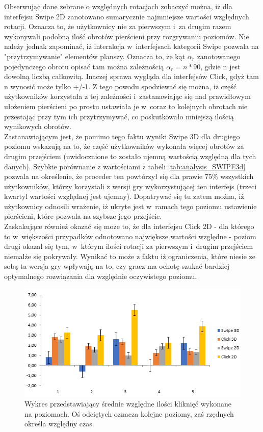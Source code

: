 \documentclass[a4paper,12pt,numbers=noenddot]{report}
\begin{document}
Obserwując dane zebrane o względnych rotacjach zobaczyć można, iż dla interfejsu Swipe 2D zanotowano sumarycznie najmniejsze wartości względnych rotacji. Oznacza to, że użytkownicy nie za pierwszym i~za drugim razem wykonywali podobną ilość obrotów pierścieni przy rozgrywaniu poziomów. Nie należy jednak zapominać, iż interakcja w~interfejsach kategorii Swipe pozwala na "przytrzymywanie" elementów planszy. Oznacza to, że kąt $\alpha_r$ zanotowanego pojedynczego obrotu opisać tam można zależnością $\alpha_r = n * 90$, gdzie n jest dowolną liczbą całkowitą. Inaczej sprawa wygląda dla interfejsów Click, gdyż tam n wynosić może tylko +/-1. Z tego powodu spodziewać się można, iż część użytkowników korzystała z tej zależności i~zastanawiając się nad prawidłowym ułożeniem pierścieni po prostu ustawiała je w~coraz to kolejnych obrotach nie przestając przy tym ich przytrzymywać, co poskutkowało mniejszą ilością wynikowych obrotów. \\
Zastanawiającym jest, że pomimo tego faktu wyniki Swipe 3D dla drugiego poziomu wskazują na to, że część użytkowników wykonała więcej obrotów za drugim przejściem (uwidocznione to zostało ujemną wartością względną dla tych danych). Szybkie porównanie z wartościami z tabeli \ref{tab:analysis_SWIPE3d} pozwala na określenie, że proceder ten powtórzył się dla prawie 75\% wszystkich użytkowników, którzy korzystali z wersji gry wykorzystującej ten interfejs (trzeci kwartyl wartości względnej jest ujemny). Dopatrywać się tu zatem można, iż użytkownicy odnosili wrażenie, iż ukryte jest w~ramach tego poziomu ustawienie pierścieni, które pozwala na szybsze jego przejście. \\
Zaskakujące również okazać się może to, że dla interfejsu Click 2D - dla którego to w~większości przypadków odnotowano największe wartości względne - poziom drugi okazał się tym, w~którym ilości rotacji za pierwszym i~drugim przejściem niemalże się pokrywały. Wynikać to może z faktu iż ograniczenia, które niesie ze sobą ta wersja gry wpływają na to, czy gracz ma ochotę szukać bardziej optymalnego rozwiązania dla względnie oczywistego poziomu.

\begin{figure}[h!]
	\centering
  	\includegraphics[width=0.9\linewidth]{diag/rel_mean_clicks.png}
	\caption{Wykres przedstawiający średnie względne ilości kliknięć wykonane na poziomach. Oś odciętych oznacza kolejne poziomy, zaś rzędnych określa względny czas.}
	\label{fig:diag:rel:mean_Clicks}
\end{figure}
\end{document}
